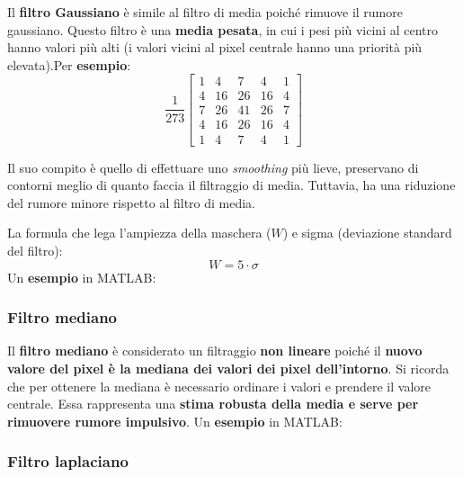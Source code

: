 \documentclass[a4paper]{article}
\begin{document}
	Il \textcolor{Red3}{\textbf{filtro Gaussiano}} è simile al filtro di media poiché rimuove il rumore gaussiano. Questo filtro è una \textbf{media pesata}, in cui i pesi più vicini al centro hanno valori più alti (i valori vicini al pixel centrale hanno una priorità più elevata).Per \textcolor{Green4}{\textbf{esempio}}:
	\begin{equation*}
		\dfrac{1}{273} \begin{bmatrix}
			1 & 4 & 7 & 4 & 1 \\
			4 & 16 & 26 & 16 & 4 \\
			7 & 26 & 41 & 26 & 7 \\
			4 & 16 & 26 & 16 & 4 \\
			1 & 4 & 7 & 4 & 1
		\end{bmatrix}
	\end{equation*}
	
	\noindent
	Il suo compito è quello di effettuare uno \emph{smoothing} più lieve, preservano di contorni meglio di quanto faccia il filtraggio di media. Tuttavia, ha una riduzione del rumore minore rispetto al filtro di media.\newline
	
	\noindent
	La formula che lega l'ampiezza della maschera ($W$) e sigma (deviazione standard del filtro):
	\begin{equation*}
		W = 5 \cdot \sigma
	\end{equation*}
	Un \textcolor{Green4}{\textbf{esempio}} in MATLAB:
	\newpage
	
	\subsubsection{Filtro mediano}
	
	Il \textcolor{Red3}{\textbf{filtro mediano}} è considerato un filtraggio \textbf{non lineare} poiché il \textbf{nuovo valore del pixel è la mediana dei valori dei pixel dell'intorno}. Si ricorda che per ottenere la mediana è necessario ordinare i valori e prendere il valore centrale. Essa rappresenta una \textbf{stima robusta della media e serve per rimuovere rumore impulsivo}. Un \textcolor{Green4}{\textbf{esempio}} in MATLAB:
	\newpage
	
	\subsubsection{Filtro laplaciano}
	
\end{document}
